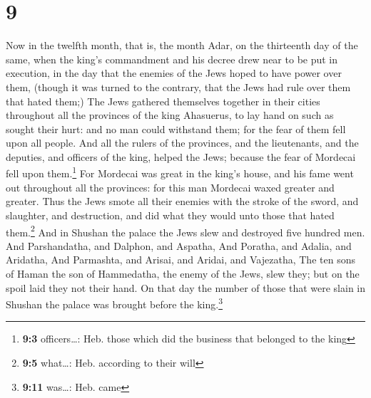 \hypertarget{section-8}{%
\section{9}\label{section-8}}

 Now in the twelfth month, that is, the month Adar, on the
thirteenth day of the same, when the king's commandment and his decree
drew near to be put in execution, in the day that the enemies of the
Jews hoped to have power over them, (though it was turned to the
contrary, that the Jews had rule over them that hated them;)
 The Jews gathered themselves together in their cities
throughout all the provinces of the king Ahasuerus, to lay hand on such
as sought their hurt: and no man could withstand them; for the fear of
them fell upon all people.  And all the rulers of the
provinces, and the lieutenants, and the deputies, and officers of the
king, helped the Jews; because the fear of Mordecai fell upon
them.\footnote{\textbf{9:3} officers\ldots: Heb. those which did the
  business that belonged to the king}  For Mordecai was
great in the king's house, and his fame went out throughout all the
provinces: for this man Mordecai waxed greater and greater.
 Thus the Jews smote all their enemies with the stroke of
the sword, and slaughter, and destruction, and did what they would unto
those that hated them.\footnote{\textbf{9:5} what\ldots: Heb. according
  to their will}  And in Shushan the palace the Jews slew
and destroyed five hundred men.  And Parshandatha, and
Dalphon, and Aspatha,  And Poratha, and Adalia, and
Aridatha,  And Parmashta, and Arisai, and Aridai, and
Vajezatha,  The ten sons of Haman the son of Hammedatha,
the enemy of the Jews, slew they; but on the spoil laid they not their
hand.  On that day the number of those that were slain in
Shushan the palace was brought before the king.\footnote{\textbf{9:11}
  was\ldots: Heb. came}


